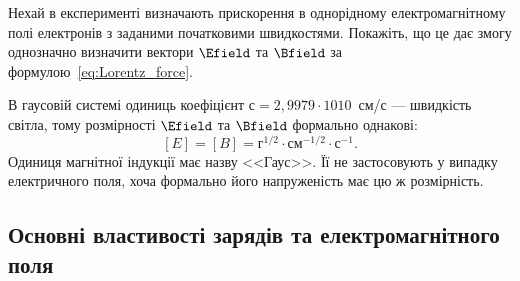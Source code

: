 \begin{problem}\label{prb:1}%
Нехай в експерименті визначають прискорення в однорідному
електромагнітному полі електронів з заданими початковими швидкостями.
Покажіть, що це дає змогу однозначно визначити вектори $\Efield$
та $\Bfield$ за формулою~\eqref{eq:Lorentz_force}.
\end{problem}

В гаусовій системі одиниць коефіцієнт $с = 2,9979⋅1010$~см/с --- швидкість
світла, тому розмірності $\Efield$
та $\Bfield$ формально однакові:
\begin{equation*}
	\left[ E\right]  = \left[ B \right]  = \text{г}^{1/2}\cdot\text{см}^{-1/2}\cdot\text{с}^{-1}.
\end{equation*}
Одиниця магнітної індукції має назву <<Гаус>>. Її не застосовують у випадку
електричного поля, хоча формально його напруженість має цю ж розмірність.


\subsection*{Основні властивості зарядів та електромагнітного поля}

